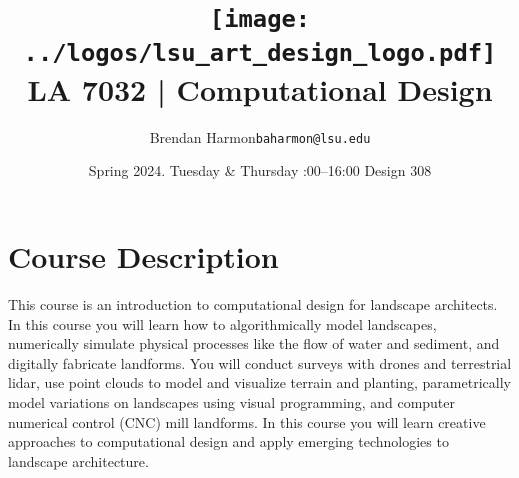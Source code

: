 \documentclass[11pt,article,oneside]{memoir}
\makeatletter
\def\myauthor{Author}
\def\mytitle{Title}
\def\myemail{baharmon@lsu.edu}
\def\myauthor{Brendan Harmon}
\def\mytitle{ \texttt{[image: ../logos/lsu\_art\_design\_logo.pdf]} \\[0.1cm] {\normalfont \normalsize LA 7032 |} \Large Computational Design}
\newcommand{\globalcolor}[1]{%
  \color{#1}\global\let\default@color\current@color
}
\makeatother
\begin{document}
\setlength\bibitemsep{0.5em}

\setmainfont{IBM Plex Sans}
\setmonofont[Scale=0.8]{IBM Plex Mono}

\def\ind{\hangindent=1 true cm\hangafter=1 \noindent}
\def\labelitemi{$\cdot$}

\title{\LARGE \mytitle}
\author{\Large\myauthor \newline \footnotesize\texttt{\noindent\myemail}}
\date{Spring 2024. \newline Tuesday \& Thursday :00--16:00 \newline Design 308}
\published{\,}


\globalcolor{black}
\vspace*{-10em}
\maketitle
{}
\clearpage



\globalcolor{black}

\vspace*{-10em}
\maketitle

\section{Course Description}

This course is an introduction to 
computational design for landscape architects.
In this course you will learn how to 
algorithmically model landscapes,
numerically simulate physical processes 
like the flow of water and sediment,
and digitally fabricate landforms.  
You will conduct surveys with drones and terrestrial lidar,
use point clouds to model and visualize terrain and planting,
parametrically model variations on landscapes
using visual programming, 
and computer numerical control (CNC) mill landforms. 
In this course you will 
learn creative approaches to computational design 
and apply emerging technologies to landscape architecture.
\\
\end{document}
